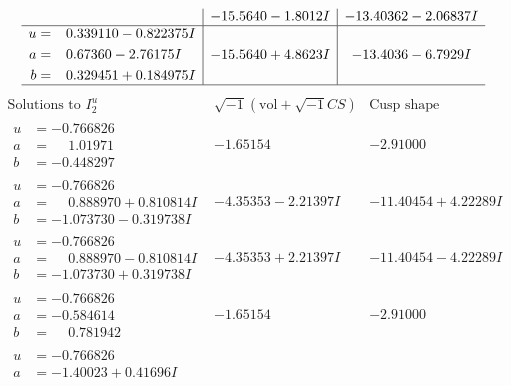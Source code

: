 \documentclass[1p]{elsarticle_modified}
\theoremstyle{definition}
\newcommand{\I}{\sqrt{-1}}
\begin{document}
$$\begin{array}{c|c|c}
 & -15.5640 - 1.8012 I & -13.40362 - 2.06837 I \\ \hline\begin{aligned}
u &= \phantom{-}0.339110 - 0.822375 I \\
a &= \phantom{-}0.67360 - 2.76175 I \\
b &= \phantom{-}0.329451 + 0.184975 I\end{aligned}
 & -15.5640 + 4.8623 I & -13.4036 - 6.7929 I\\
 \hline 
 \end{array}$$\newpage$$\begin{array}{c|c|c}  
\text{Solutions to }I^u_{2}& \I (\text{vol} + \sqrt{-1}CS) & \text{Cusp shape}\\
 \hline 
\begin{aligned}
u &= -0.766826\phantom{ +0.000000I} \\
a &= \phantom{-}1.01971\phantom{ +0.000000I} \\
b &= -0.448297\phantom{ +0.000000I}\end{aligned}
 & -1.65154\phantom{ +0.000000I} & -2.91000\phantom{ +0.000000I} \\ \hline\begin{aligned}
u &= -0.766826\phantom{ +0.000000I} \\
a &= \phantom{-}0.888970 + 0.810814 I \\
b &= -1.073730 - 0.319738 I\end{aligned}
 & -4.35353 - 2.21397 I & -11.40454 + 4.22289 I \\ \hline\begin{aligned}
u &= -0.766826\phantom{ +0.000000I} \\
a &= \phantom{-}0.888970 - 0.810814 I \\
b &= -1.073730 + 0.319738 I\end{aligned}
 & -4.35353 + 2.21397 I & -11.40454 - 4.22289 I \\ \hline\begin{aligned}
u &= -0.766826\phantom{ +0.000000I} \\
a &= -0.584614\phantom{ +0.000000I} \\
b &= \phantom{-}0.781942\phantom{ +0.000000I}\end{aligned}
 & -1.65154\phantom{ +0.000000I} & -2.91000\phantom{ +0.000000I} \\ \hline\begin{aligned}
u &= -0.766826\phantom{ +0.000000I} \\
a &= -1.40023 + 0.41696 I \\

\end{aligned}
\end{array}$$
\end{document}
